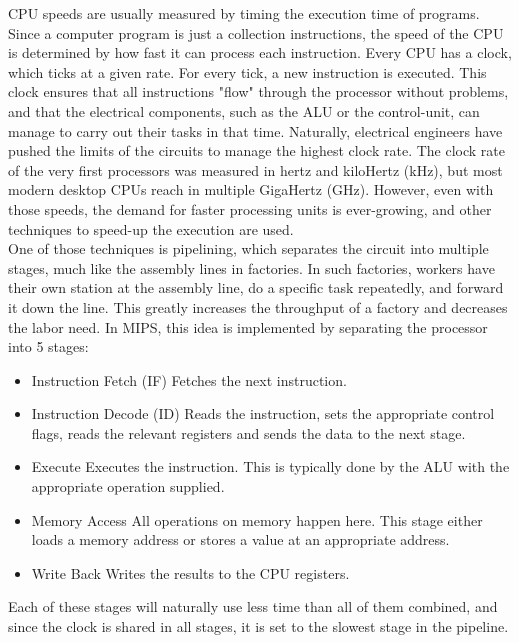 CPU speeds are usually measured by timing the execution time of programs. Since
a computer program is just a collection instructions, the speed of the CPU is
determined by how fast it can process each instruction.
Every CPU has a clock, which ticks at a given rate. For every tick, a new
instruction is executed. This clock ensures that all instructions "flow" through
the processor without problems, and that the electrical components, such as the
ALU or the control-unit, can manage to carry out their tasks in that time.
Naturally, electrical engineers have pushed the limits of the circuits to manage
the highest clock rate. The clock rate of the very first processors was measured
in hertz and kiloHertz (kHz), but most modern desktop CPUs reach in multiple
GigaHertz (GHz)\cite{wiki:clock_rate}. However, even with those speeds, the
demand for faster processing units is ever-growing, and other techniques to speed-up
the execution are used.\\
One of those techniques is pipelining, which separates the circuit into multiple
stages, much like the assembly lines in factories. In such factories, workers
have their own station at the assembly line, do a specific task repeatedly, and
forward it down the line. This greatly increases the throughput of a factory and
decreases the labor need.
In MIPS, this idea is implemented by separating the processor into 5 stages\cite{COD5}:
\begin{itemize}
	\item Instruction Fetch (IF)
Fetches the next instruction.

	\item Instruction Decode (ID)
Reads the instruction, sets the appropriate control flags, reads the relevant
registers and sends the data to the next stage.

	\item Execute
Executes the instruction. This is typically done by the ALU with the appropriate
operation supplied.

	\item Memory Access
All operations on memory happen here. This stage either loads a memory address
or stores a value at an appropriate address.

	\item Write Back
Writes the results to the CPU registers.
\end{itemize}
Each of these stages will naturally use less time than all of them combined, and
since the clock is shared in all stages, it is set to the slowest stage in the
pipeline.\\

